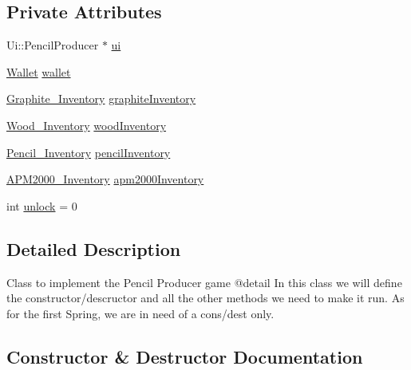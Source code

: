 \subsection*{Private Attributes}
\begin{DoxyCompactItemize}
\item 
Ui\+::\+Pencil\+Producer $\ast$ \mbox{\hyperlink{classPencilProducer_af8ef000b90959052d1ab135ca9764621}{ui}}
\item 
\mbox{\hyperlink{classWallet}{Wallet}} \mbox{\hyperlink{classPencilProducer_a9ce8a9dbf5deb875692d5dcec4374e2d}{wallet}}
\item 
\mbox{\hyperlink{classGraphite__Inventory}{Graphite\+\_\+\+Inventory}} \mbox{\hyperlink{classPencilProducer_a04a8078a404418407a30a4175aaf890a}{graphite\+Inventory}}
\item 
\mbox{\hyperlink{classWood__Inventory}{Wood\+\_\+\+Inventory}} \mbox{\hyperlink{classPencilProducer_ac0454fe420705b3e3e922661e89ecee0}{wood\+Inventory}}
\item 
\mbox{\hyperlink{classPencil__Inventory}{Pencil\+\_\+\+Inventory}} \mbox{\hyperlink{classPencilProducer_ad1c13392410c1e57b6baff0bfde51e75}{pencil\+Inventory}}
\item 
\mbox{\hyperlink{classAPM2000__Inventory}{A\+P\+M2000\+\_\+\+Inventory}} \mbox{\hyperlink{classPencilProducer_a6af6334d9d18c19f235411a4c5fafb46}{apm2000\+Inventory}}
\item 
int \mbox{\hyperlink{classPencilProducer_a4b443630a23b42fcf66cd9ba632a89c9}{unlock}} = 0
\end{DoxyCompactItemize}


\subsection{Detailed Description}
Class to implement the Pencil Producer game @detail In this class we will define the constructor/descructor and all the other methods we need to make it run. As for the first Spring, we are in need of a cons/dest only. 

\subsection{Constructor \& Destructor Documentation}
\mbox{\label{classPencilProducer_a7b5425cd4bfd41d7b9cc9fe04101df06}} 
